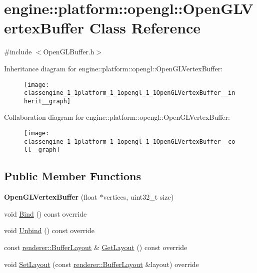\hypertarget{classengine_1_1platform_1_1opengl_1_1OpenGLVertexBuffer}{}\section{engine\+:\+:platform\+:\+:opengl\+:\+:Open\+G\+L\+Vertex\+Buffer Class Reference}
\label{classengine_1_1platform_1_1opengl_1_1OpenGLVertexBuffer}


{\ttfamily \#include $<$Open\+G\+L\+Buffer.\+h$>$}



Inheritance diagram for engine\+:\+:platform\+:\+:opengl\+:\+:Open\+G\+L\+Vertex\+Buffer\+:\nopagebreak
\begin{figure}[H]
\begin{center}
\leavevmode
\texttt{[image: classengine\_1\_1platform\_1\_1opengl\_1\_1OpenGLVertexBuffer\_\_inherit\_\_graph]}
\end{center}
\end{figure}


Collaboration diagram for engine\+:\+:platform\+:\+:opengl\+:\+:Open\+G\+L\+Vertex\+Buffer\+:\nopagebreak
\begin{figure}[H]
\begin{center}
\leavevmode
\texttt{[image: classengine\_1\_1platform\_1\_1opengl\_1\_1OpenGLVertexBuffer\_\_coll\_\_graph]}
\end{center}
\end{figure}
\subsection*{Public Member Functions}
\begin{DoxyCompactItemize}
\item 
\mbox{\label{classengine_1_1platform_1_1opengl_1_1OpenGLVertexBuffer_a481164805afb44795f3e545e07c3b3bc}} 
{\bfseries Open\+G\+L\+Vertex\+Buffer} (float $\ast$vertices, uint32\+\_\+t size)
\item 
void \hyperlink{classengine_1_1platform_1_1opengl_1_1OpenGLVertexBuffer_ac50918719a747f81d7fe94dfcc8dec13}{Bind} () const override
\item 
void \hyperlink{classengine_1_1platform_1_1opengl_1_1OpenGLVertexBuffer_a9069ca746c0de9dd9418ba9c5ee7b67b}{Unbind} () const override
\item 
const \hyperlink{classengine_1_1renderer_1_1BufferLayout}{renderer\+::\+Buffer\+Layout} \& \hyperlink{classengine_1_1platform_1_1opengl_1_1OpenGLVertexBuffer_a0d4f81503171f6bbe41ece0fada23390}{Get\+Layout} () const override
\item 
void \hyperlink{classengine_1_1platform_1_1opengl_1_1OpenGLVertexBuffer_a957a9dc55dc35ce4302654e1a394e5f8}{Set\+Layout} (const \hyperlink{classengine_1_1renderer_1_1BufferLayout}{renderer\+::\+Buffer\+Layout} \&layout) override
\end{DoxyCompactItemize}

